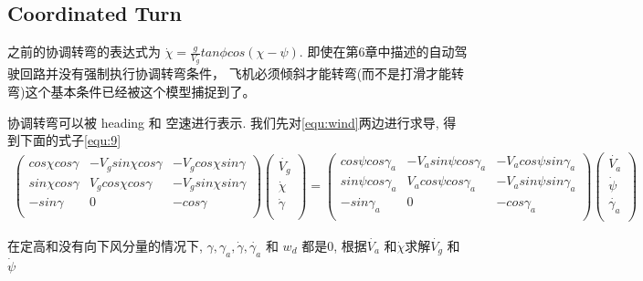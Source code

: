       \subsection{Coordinated Turn}
      之前的协调转弯的表达式为 $\dot{\chi} = \frac{g}{V_{g}} tan \phi cos(\chi - \psi)$. 
      即使在第6章中描述的自动驾驶回路并没有强制执行协调转弯条件，
      飞机必须倾斜才能转弯(而不是打滑才能转弯)这个基本条件已经被这个模型捕捉到了。\par
      协调转弯可以被 heading 和 空速进行表示. 我们先对\ref{equ:wind}两边进行求导, 得到下面的式子\ref{equ:9}
      \begin{gather} %
        \begin{pmatrix}
            cos \chi cos \gamma & - V_{g} sin \chi cos \gamma & - V_{g} cos \chi sin \gamma \\
            sin \chi cos \gamma & V_{g} cos \chi cos \gamma & - V_{g} sin \chi sin \gamma \\
            -sin \gamma & 0 & -cos \gamma \\
          \end{pmatrix} \begin{pmatrix}
            \dot{V_{g}} \\
            \dot{\chi} \\
            \dot{\gamma} \\
        \end{pmatrix}
          = \begin{pmatrix}
            cos \psi cos \gamma_{a} & - V_{a} sin \psi cos \gamma_{a} & - V_{a} cos \psi sin \gamma_{a} \\
            sin \psi cos \gamma_{a} & V_{a} cos \psi cos \gamma_{a} & - V_{a} sin \psi sin \gamma_{a} \\
            -sin \gamma_{a} & 0 & -cos \gamma_{a} \\
          \end{pmatrix} \begin{pmatrix}
            \dot{V_{a}} \\
            \dot{\psi} \\
            \dot{\gamma_{a}} \\
        \end{pmatrix}
          \label{equ:9}
      \end{gather}
      \par 在定高和没有向下风分量的情况下, $\gamma, \gamma_{a}, \dot{\gamma}, \dot{\gamma_a}$ 和 $w_{d}$ 都是0, 根据$\dot{V_{a}}$ 和$\dot{\chi}$求解$\dot{V_{g}}$ 和$\dot{\psi}$
